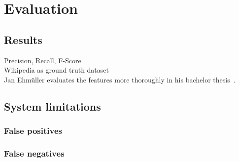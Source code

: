 \section{Evaluation}
\label{sec:evaluation}
\subsection{Results}
Precision, Recall, F-Score\\
Wikipedia as ground truth dataset\\
Jan Ehmüller evaluates the features more thoroughly in his bachelor thesis~\cite{Jan}.

\subsection{System limitations}
\subsubsection{False positives}
\subsubsection{False negatives}